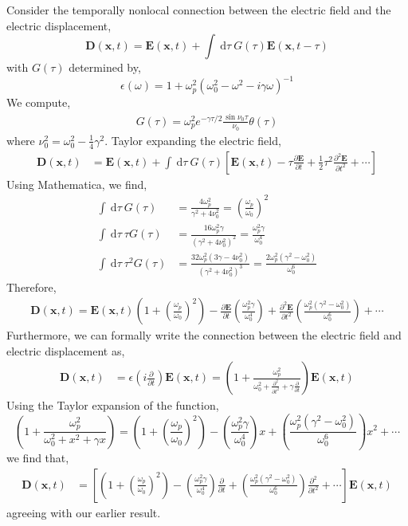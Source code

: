 \documentclass[12pt]{extarticle}
\renewcommand{\d}[1]{\: \mathrm{d}#1}
\newcommand{\pderiv}[2]{\frac{\partial{#1}}{\partial{#2}}}
\renewcommand{\bf}[1]{\mathbf{#1}}
\theoremstyle{definition}
\begin{document}
Consider the temporally nonlocal connection between the electric field and the electric displacement,
\[ \bf{D}(\bf{x}, t) = \bf{E}(\bf{x}, t) + \int \d{\tau} \: G(\tau) \bf{E}(\bf{x}, t - \tau) \]
with $G(\tau)$ determined by,
\[ \epsilon(\omega) = 1 + \omega_p^2(\omega_0^2 - \omega^2 - i \gamma \omega)^{-1} \]
We compute,
\begin{align*}
G(\tau) = \omega_p^2 e^{-\gamma \tau/2} \frac{\sin{\nu_0 \tau}}{\nu_0} \theta(\tau) 
\end{align*} 
where $\nu_0^2 = \omega_0^2 - \tfrac{1}{4} \gamma^2$. 
Taylor expanding the electric field,
\begin{align*}
\bf{D}(\bf{x}, t) & = \bf{E}(\bf{x}, t) + \int \d{\tau} \: G(\tau) \left[ \bf{E}(\bf{x}, t) - \tau \pderiv{\bf{E}}{t} + \frac{1}{2} \tau^2 \frac{\partial^2 \bf{E}}{\partial t^2} + \cdots \right]
\end{align*}
Using Mathematica, we find,
\begin{align*}
\int \d{\tau} \: G(\tau) & = \frac{4 \omega_p^2}{\gamma^2 + 4 \nu_0^2} = \left( \frac{\omega_p}{\omega_0} \right)^2 
\\
\int \d{\tau} \: \tau G(\tau) & = \frac{16 \omega_p^2 \gamma}{(\gamma^2 + 4 \nu_0^2)^2} = \frac{\omega_p^2 \gamma}{\omega_0^4}
\\
\int \d{\tau} \: \tau^2 G(\tau) & = \frac{32 \omega_p^2 (3 \gamma - 4 \nu_0^2)}{(\gamma^2 + 4 \nu_0^2)^3} = \frac{2 \omega_p^2 (\gamma^2 - \omega_0^2)}{\omega_0^6}
\end{align*}
Therefore,
\begin{align*}
\bf{D}(\bf{x}, t) = \bf{E}(\bf{x}, t) \left( 1 + \left( \frac{\omega_p}{\omega_0} \right)^2 \right) - \pderiv{\bf{E}}{t} \left( \frac{\omega_p^2 \gamma}{\omega_0^4} \right) + \frac{\partial^2 \bf{E}}{\partial t^2} \left( \frac{\omega_p^2 ( \gamma^2 - \omega_0^2)}{\omega_0^6} \right) + \cdots 
\end{align*}
Furthermore, we can formally write the connection between the electric field and electric displacement as,
\begin{align*}
\bf{D}(\bf{x}, t) & = \epsilon\left(i \pderiv{}{t} \right) \bf{E}(\bf{x}, t) = \left( 1 + \frac{\omega_p^2}{\omega_0^2 + \frac{\partial^2}{\partial t^2} + \gamma \pderiv{}{t}} \right) \bf{E}(\bf{x}, t)
\end{align*}
Using the Taylor expansion of the function,
\[  \left( 1 + \frac{\omega_p^2}{\omega_0^2 + x^2 + \gamma x} \right) = \left( 1 + \left( \frac{\omega_p}{\omega_0} \right)^2 \right) - \left( \frac{\omega_p^2 \gamma}{\omega_0^4} \right) x + \left( \frac{\omega_p^2 (\gamma^2 - \omega_0^2)}{\omega_0^6} \right) x^2 + \cdots \]
we find that,
\begin{align*}
\bf{D}(\bf{x}, t) & = \left[ \left( 1 + \left( \frac{\omega_p}{\omega_0} \right)^2 \right) - \left( \frac{\omega_p^2 \gamma}{\omega_0^4} \right) \pderiv{}{t} + \left( \frac{\omega_p^2 (\gamma^2 - \omega_0^2)}{\omega_0^6} \right) \frac{\partial^2}{\partial t^2} + \cdots \right] \bf{E}(\bf{x}, t)
\end{align*}
agreeing with our earlier result. 
\end{document}
